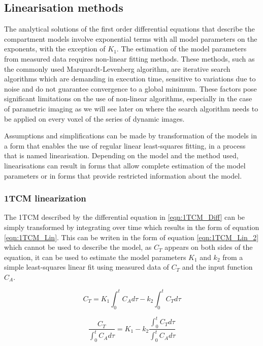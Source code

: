 \subsection{Linearisation methods}
The analytical solutions of the first order differential equations that describe the compartment models involve exponential terms with all model parameters on the exponents, with the exception of $K_1$. The estimation of the model parameters from measured data requires non-linear fitting methods. These methods, such as the commonly used Marquardt-Levenberg algorithm, are iterative search algorithms which are demanding in execution time, sensitive to variations due to noise and do not guarantee convergence to a global minimum. These factors pose significant limitations on the use of non-linear algorithms, especially in the case of parametric imaging as we will see later on where the search algorithm needs to be applied on every voxel of the series of dynamic images.\par
Assumptions and simplifications can be made by transformation of the models in a form that enables the use of regular linear least-squares fitting, in a process that is named linearisation. Depending on the model and the method used, linearisations can result in forms that allow complete estimation of the model parameters or in forms that provide restricted information about the model. 

\subsubsection{1TCM linearization}
The 1TCM described by the differential equation in \ref{eqn:1TCM_Diff} can be simply transformed by integrating over time which results in the form of equation \ref{eqn:1TCM_Lin}. This can be writen in the form of equation \ref{eqn:1TCM_Lin_2} which cannot be used to describe the model, as $C_T$ appears on both sides of the equation, it can be used to estimate the model parameters $K_1$ and $k_2$ from a simple least-squares linear fit using measured data of $C_T$ and the input function $C_A$. 

\begin{equation}
C_T = K_1 \int_{0}^{t} C_A d\tau  - k_2 \int_{0}^{t} C_T d\tau
\label{eqn:1TCM_Lin}
\end{equation}

\begin{equation}
\frac{C_T}{\int_{0}^{t} C_A d\tau} = K_1 - k_2 \frac{\int_{0}^{t} C_T d\tau}{\int_{0}^{t} C_A d\tau} 
\label{eqn:1TCM_Lin_2}
\end{equation}

